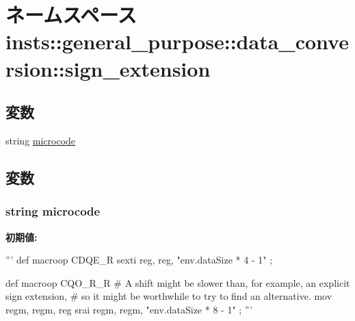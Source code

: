\hypertarget{namespaceinsts_1_1general__purpose_1_1data__conversion_1_1sign__extension}{
\section{ネームスペース insts::general\_\-purpose::data\_\-conversion::sign\_\-extension}
\label{namespaceinsts_1_1general__purpose_1_1data__conversion_1_1sign__extension}
}
\subsection*{変数}
\begin{DoxyCompactItemize}
\item 
string \hyperlink{namespaceinsts_1_1general__purpose_1_1data__conversion_1_1sign__extension_a770f11a173e99389a8802f0107ed8f52}{microcode}
\end{DoxyCompactItemize}


\subsection{変数}
\hypertarget{namespaceinsts_1_1general__purpose_1_1data__conversion_1_1sign__extension_a770f11a173e99389a8802f0107ed8f52}{
\subsubsection[{microcode}]{\setlength{\rightskip}{0pt plus 5cm}string {\bf microcode}}}
\label{namespaceinsts_1_1general__purpose_1_1data__conversion_1_1sign__extension_a770f11a173e99389a8802f0107ed8f52}
{\bfseries 初期値:}
\begin{DoxyCode}
'''
def macroop CDQE_R {
    sexti reg, reg, "env.dataSize * 4 - 1"
};

def macroop CQO_R_R {
    # A shift might be slower than, for example, an explicit sign extension,
    # so it might be worthwhile to try to find an alternative.
    mov regm, regm, reg
    srai regm, regm, "env.dataSize * 8 - 1"
};
'''
\end{DoxyCode}
